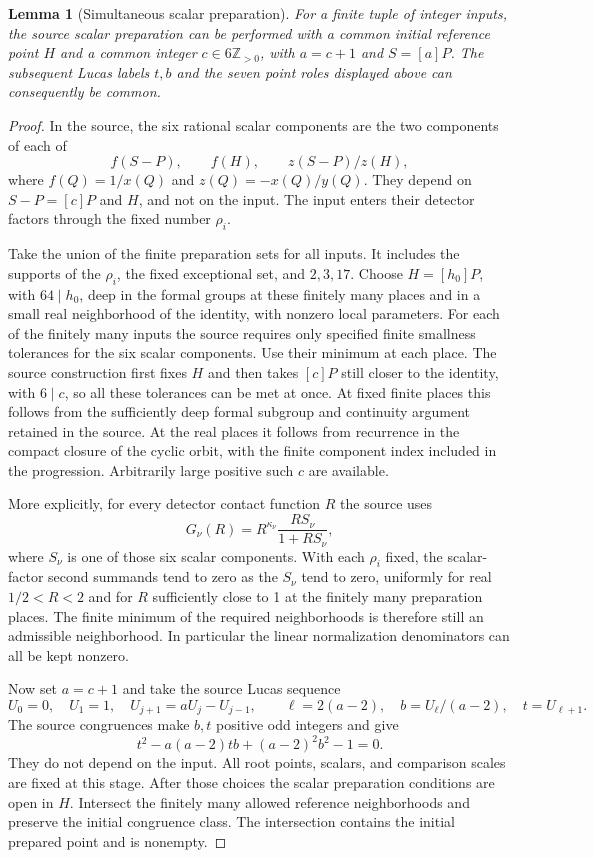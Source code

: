 \documentclass[11pt]{article}
\newtheorem{lemma}[theorem]{Lemma}
\begin{document}
\begin{lemma}[Simultaneous scalar preparation]
\label{lem:joint-few-scalar}
For a finite tuple of integer inputs, the source scalar preparation
can be performed with a common initial reference point $H$ and
a common integer $c\in6\mathbb Z_{>0}$, with $a=c+1$ and
$S=[a]P$.  The subsequent Lucas labels $t,b$ and the seven point
roles displayed above can consequently be common.
\end{lemma}
\begin{proof}
In the source, the six rational scalar components are the two
components of each of
\[
                   f(S-P),\qquad f(H),\qquad
                   z(S-P)/z(H),
\]
where $f(Q)=1/x(Q)$ and $z(Q)=-x(Q)/y(Q)$.  They depend on
$S-P=[c]P$ and $H$, and not on the input.  The input enters their
detector factors through the fixed number $\rho_i$.

Take the union of the finite preparation sets for all inputs.  It
includes the supports of the $\rho_i$, the fixed exceptional set,
and $2,3,17$.  Choose $H=[h_0]P$, with $64\mid h_0$, deep in the
formal groups at these finitely many places and in a small real
neighborhood of the identity, with nonzero local parameters.
For each of the finitely many inputs the source requires only
specified finite smallness tolerances for the six scalar components.
Use their minimum at each place.  The source construction first
fixes $H$ and then takes $[c]P$ still closer to the identity, with
$6\mid c$, so all these tolerances can be met at once.  At fixed
finite places this follows from the sufficiently deep formal
subgroup and continuity argument retained in the source.  At the
real places it follows from recurrence in the compact closure of
the cyclic orbit, with the finite component index included in the
progression.  Arbitrarily large positive such $c$ are available.

More explicitly, for every detector contact function $R$ the source
uses
\[
       G_\nu(R)=R^{\kappa_\nu}
                       \frac{R S_\nu}{1+R S_\nu},
\]
where $S_\nu$ is one of those six scalar components.  With each
$\rho_i$ fixed, the scalar-factor second summands tend to zero
as the $S_\nu$ tend to zero, uniformly for real $1/2<R<2$ and
for $R$ sufficiently close to 1 at the finitely many preparation
places.  The finite minimum of the required neighborhoods is
therefore still an admissible neighborhood.  In particular the
linear normalization denominators can all be kept nonzero.

Now set $a=c+1$ and take the source Lucas sequence
\[
 U_0=0,\quad U_1=1,\quad U_{j+1}=aU_j-U_{j-1},\qquad
 \ell=2(a-2),\quad b=U_\ell/(a-2),\quad t=U_{\ell+1}.
\]
The source congruences make $b,t$ positive odd integers and give
\[
                  t^2-a(a-2)tb+(a-2)^2b^2-1=0.
\]
They do not depend on the input.  All root points, scalars, and
comparison scales are fixed at this stage.  After those choices
the scalar preparation conditions are open in $H$.  Intersect the
finitely many allowed reference neighborhoods and preserve the
initial congruence class.  The intersection contains the initial
prepared point and is nonempty.
\end{proof}
\end{document}
